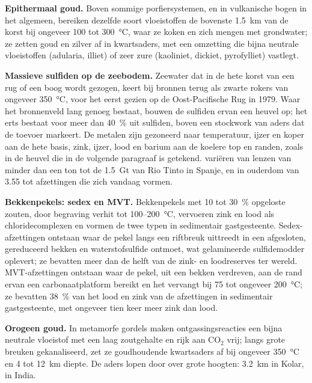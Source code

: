 \textbf{Epithermaal goud.} Boven sommige porfiersystemen, en in vulkanische bogen in het algemeen, bereiken
dezelfde soort vloeistoffen de bovenste \qty{1.5}{km} van de korst bij ongeveer 100 tot \qty{300}{\celsius},
waar ze koken en zich mengen met grondwater; ze zetten goud en zilver af in kwartsaders, met een
omzetting die bijna neutrale vloeistoffen (adularia, illiet) of zeer zure (kaoliniet,
dickiet, pyrofylliet) vastlegt.

\textbf{Massieve sulfiden op de zeebodem.} Zeewater dat in de hete korst van een rug of
een boog wordt gezogen, keert bij bronnen terug als zwarte rokers van ongeveer \qty{350}{\celsius}, voor het eerst gezien op de
Oost-Pacifische Rug in 1979. Waar het bronnenveld lang genoeg bestaat, bouwen de sulfiden ervan een heuvel op; het erts bestaat voor meer dan
\qty{40}{\percent} uit sulfiden, boven een stockwork van aders dat de toevoer markeert. De metalen zijn gezoneerd
naar temperatuur, ijzer en koper aan de hete basis, zink, ijzer, lood en barium aan de koelere top en
randen, zoals in de heuvel die in de volgende paragraaf is getekend.  variëren van lenzen van minder dan een ton tot de \qty{1.5}{Gt} van Rio Tinto in Spanje, en in
ouderdom van \qty{3.55}{\Ga} tot afzettingen die zich vandaag vormen.

\textbf{Bekkenpekels: sedex en MVT.} Bekkenpekels met 10 tot \qty{30}{\percent} opgeloste zouten,
door begraving verhit tot 100--\qty{200}{\celsius}, vervoeren zink en lood als chloridecomplexen en vormen de
twee typen in sedimentair gastgesteente. Sedex-afzettingen ontstaan waar de pekel langs een riftbreuk uittreedt in een afgesloten, gereduceerd
bekken en waterstofsulfide ontmoet, wat gelamineerde sulfidemodder oplevert; ze bevatten meer
dan de helft van de zink- en loodreserves ter wereld. MVT-afzettingen ontstaan waar de pekel, uit een
bekken verdreven, aan de rand ervan een carbonaatplatform bereikt en het vervangt bij 75 tot ongeveer
\qty{200}{\celsius}; ze bevatten \qty{38}{\percent} van het lood en zink van de afzettingen in sedimentair gastgesteente,
met ongeveer tien keer meer zink dan lood.

\textbf{Orogeen goud.} In metamorfe gordels maken ontgassingsreacties een bijna neutrale vloeistof
met een laag zoutgehalte en rijk aan CO$_2$ vrij; langs grote breuken gekanaliseerd, zet ze goudhoudende
kwartsaders af bij ongeveer \qty{350}{\celsius} en 4 tot \qty{12}{km} diepte. De aders lopen door over
grote hoogten: \qty{3.2}{km} in Kolar, in India.

